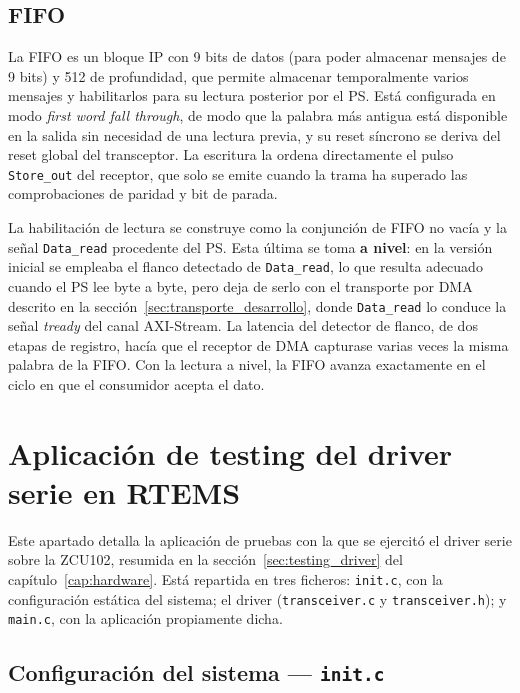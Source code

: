\subsection{FIFO}

La FIFO es un bloque IP con 9 bits de datos (para poder almacenar mensajes de 9 bits) y
512 de profundidad, que permite almacenar temporalmente varios mensajes y habilitarlos
para su lectura posterior por el PS. Está configurada en modo \textit{first word fall through},
de modo que la palabra más antigua está disponible en la salida sin necesidad de una lectura
previa, y su reset síncrono se deriva del reset global del transceptor. La escritura la ordena
directamente el pulso \texttt{Store\_out} del receptor, que solo se emite cuando la trama ha
superado las comprobaciones de paridad y bit de parada.

La habilitación de lectura se construye como la conjunción de FIFO no vacía y la señal
\texttt{Data\_read} procedente del PS. Esta última se toma \textbf{a nivel}: en la versión inicial
se empleaba el flanco detectado de \texttt{Data\_read}, lo que resulta adecuado cuando el PS lee
byte a byte, pero deja de serlo con el transporte por DMA descrito en la
sección~\ref{sec:transporte_desarrollo}, donde \texttt{Data\_read} lo conduce la señal
\textit{tready} del canal AXI-Stream. La latencia del detector de flanco, de dos etapas de
registro, hacía que el receptor de DMA capturase varias veces la misma palabra de la FIFO. Con
la lectura a nivel, la FIFO avanza exactamente en el ciclo en que el consumidor acepta el dato.

\section{Aplicación de testing del driver serie en RTEMS} \label{anxC:testing_driver}

Este apartado detalla la aplicación de pruebas con la que se ejercitó el driver serie sobre la
ZCU102, resumida en la sección~\ref{sec:testing_driver} del capítulo~\ref{cap:hardware}. Está repartida
en tres ficheros: \texttt{init.c}, con la configuración estática del sistema; el driver
(\texttt{transceiver.c} y \texttt{transceiver.h}); y \texttt{main.c}, con la aplicación propiamente
dicha.

\subsection{Configuración del sistema --- \texttt{init.c}}

